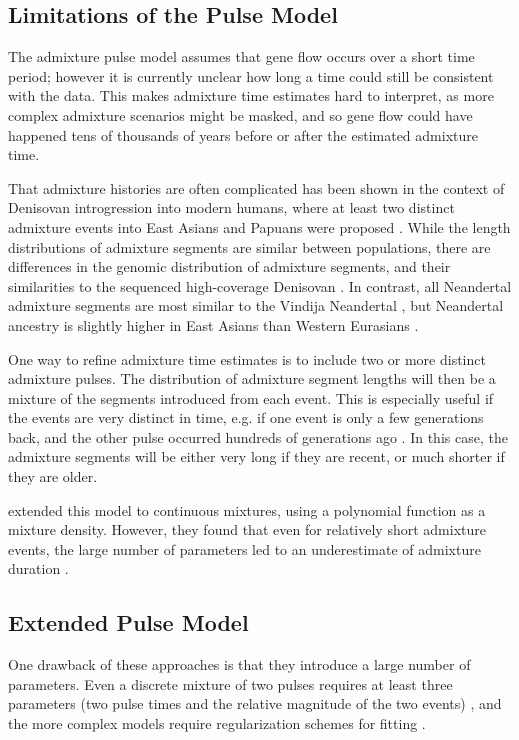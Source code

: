 \documentclass[11pt]{article}
\begin{document}
\subsection{Limitations of the Pulse Model}\label{Why can't we us the pulse model}

The admixture pulse model assumes that gene flow occurs over a short time period; however it is currently unclear how long a time could still be consistent with the data. This makes admixture time estimates hard to interpret, as more complex admixture scenarios might be masked, and so gene flow could have happened tens of thousands of years before or after the estimated admixture time.

That admixture histories are often complicated has been shown in the context of Denisovan introgression into modern humans, where at least two distinct admixture events into East Asians and Papuans were proposed \citep{browning_analysis_2018, jacobs_multiple_2019,choin_genomic_2021}. While the length distributions of admixture segments are similar between populations, there are  differences in the genomic distribution of admixture segments, and their similarities to the sequenced high-coverage Denisovan \citep{browning_analysis_2018, massilani_denisovan_2020}. In contrast, all Neandertal admixture segments are most similar to the Vindija Neandertal  \citep{prufer_high-coverage_2017}, but Neandertal ancestry is slightly higher in East Asians than Western Eurasians \citep{meyer_high-coverage_2012, wall_higher_2013,kim_selection_2015,vernot_complex_2015,villanea_multiple_2019}.

One way to refine admixture time estimates is to include two or more distinct admixture pulses. The distribution of admixture segment lengths will then be a mixture of the segments introduced from each event. This is especially useful if the events are very distinct in time, e.g. if one event is only a few generations back, and the other pulse occurred hundreds of generations ago \citep{fu_genome_2014, fu_early_2015}. In this case, the admixture segments will be either very long if they are recent, or much shorter if they are older.

\cite{zhou_modeling_2017} extended this model to continuous mixtures, using a polynomial function as a mixture density. However, they found that even for relatively short admixture events, the large number of parameters led to an underestimate of admixture duration \citep{zhou_inference_2017}. 
\subsection{Extended Pulse Model}
One drawback of these approaches is that they introduce a large number of parameters. Even a discrete mixture of two pulses requires at least three parameters (two pulse times and the relative magnitude of the two events) \citep{pickrell_ancient_2014}, and the more complex models require regularization schemes for fitting \citep{zhou_inference_2017, ralph_geography_2013}.
\end{document}
